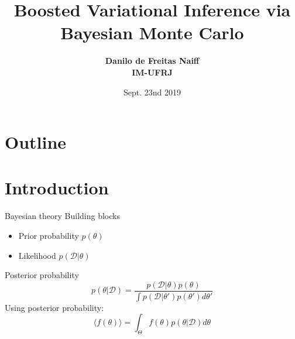\documentclass{beamer}
\title{Boosted Variational Inference via Bayesian Monte Carlo}
\author[Danilo Naiff]{{{\bf \large Danilo de Freitas Naiff} \vspace{0.75cm} \\{\bf IM-UFRJ}} \\ \vspace{0.8cm}}
\date{Sept. 23nd 2019}
\begin{document}
	\frame{\titlepage}


\section*{Outline}
\begin{frame}{}\tableofcontents
\end{frame}
\begin{frame}
\titlepage
\end{frame}

\section{Introduction}

\begin{frame}{}
\begin{block}{Bayesian theory}
Building blocks
\begin{itemize}
\item Prior probability $p(\theta)$
\item Likelihood $p(\mathcal{D}|\theta)$
\end{itemize}

Posterior probability
\begin{equation*}
p(\mathcal{\theta}|\mathcal{D}) = \frac{p(\mathcal{D}|\theta) p(\theta)}{\int p(\mathcal{D}|\theta') p(\theta') d \theta'}
\end{equation*}
Using posterior probability:
\begin{equation*}
\langle f(\theta) \rangle = \int_\Theta f(\theta) p(\theta|\mathcal{D}) d \theta
\end{equation*}
\end{block}
\begin{block}{}
\end{block}

\end{frame}
\end{document}
